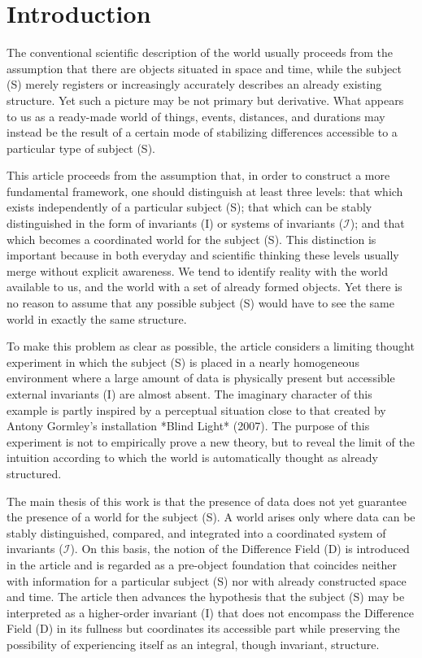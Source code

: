\documentclass[aps,prd,onecolumn,nofootinbib,superscriptaddress]{revtex4-2}
\begin{document}
\section{Introduction}
The conventional scientific description of the world usually proceeds from the assumption that there are objects situated in space and time, while the subject (S) merely registers or increasingly accurately describes an already existing structure. Yet such a picture may be not primary but derivative. What appears to us as a ready-made world of things, events, distances, and durations may instead be the result of a certain mode of stabilizing differences accessible to a particular type of subject (S).

This article proceeds from the assumption that, in order to construct a more fundamental framework, one should distinguish at least three levels: that which exists independently of a particular subject (S); that which can be stably distinguished in the form of invariants (I) or systems of invariants ($\mathcal{I}$); and that which becomes a coordinated world for the subject (S). This distinction is important because in both everyday and scientific thinking these levels usually merge without explicit awareness. We tend to identify reality with the world available to us, and the world with a set of already formed objects. Yet there is no reason to assume that any possible subject (S) would have to see the same world in exactly the same structure.

To make this problem as clear as possible, the article considers a limiting thought experiment in which the subject (S) is placed in a nearly homogeneous environment where a large amount of data is physically present but accessible external invariants (I) are almost absent. The imaginary character of this example is partly inspired by a perceptual situation close to that created by Antony Gormley’s installation *Blind Light* (2007). The purpose of this experiment is not to empirically prove a new theory, but to reveal the limit of the intuition according to which the world is automatically thought as already structured.

The main thesis of this work is that the presence of data does not yet guarantee the presence of a world for the subject (S). A world arises only where data can be stably distinguished, compared, and integrated into a coordinated system of invariants ($\mathcal{I}$). On this basis, the notion of the Difference Field (D) is introduced in the article and is regarded as a pre-object foundation that coincides neither with information for a particular subject (S) nor with already constructed space and time. The article then advances the hypothesis that the subject (S) may be interpreted as a higher-order invariant (I) that does not encompass the Difference Field (D) in its fullness but coordinates its accessible part while preserving the possibility of experiencing itself as an integral, though invariant, structure.
\end{document}
